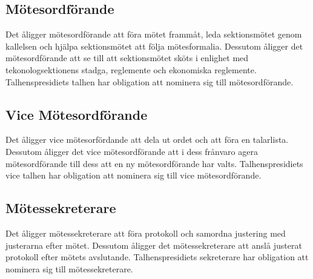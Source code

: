 \subsection{Mötesordförande}
Det åligger mötesordförande att föra mötet frammåt, leda sektionsmötet genom kallelsen och hjälpa sektionsmötet att följa mötesformalia.
Dessutom åligger det mötesordförande att se till att sektionsmötet sköts i enlighet med tekonologsektionens stadga, reglemente och ekonomiska reglemente.
Talhenspresidiets talhen har obligation att nominera sig till mötesordförande.
\subsection{Vice Mötesordförande}
Det åligger vice mötesorfördande att dela ut ordet och att föra en talarlista.
Dessutom åligger det vice mötesordförande att i dess frånvaro agera mötesordförande till dess att en ny mötesordförande har valts.
Talhenspresidiets vice talhen har obligation att nominera sig till vice mötesordförande.
\subsection{Mötessekreterare}
Det åligger mötessekreterare att föra protokoll och samordna justering med justerarna efter mötet. 
Dessutom åligger det mötessekreterare att anslå justerat protokoll efter mötets avslutande.
Talhenspresidiets sekreterare har obligation att nominera sig till mötessekreterare.

\newpage

